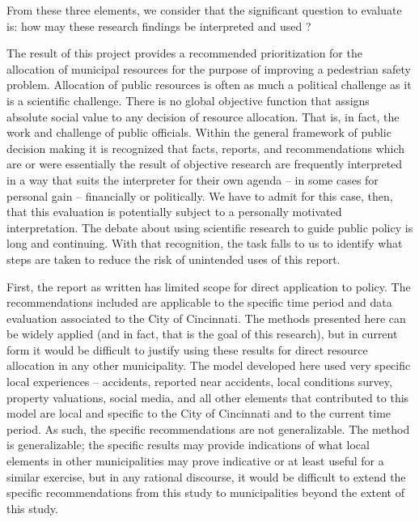 \documentclass{llncs}
\begin{document}
From these three elements, we consider that the significant question to evaluate is: how may these research findings be interpreted and used ?

The result of this project provides a recommended prioritization for the allocation of municipal resources for the purpose of improving a pedestrian safety problem. Allocation of  public resources is often as much a political challenge as it is a scientific challenge. There is no global objective function that assigns absolute social value to any decision of resource allocation. That is, in fact, the work and challenge of public officials. Within the general framework of public decision making it is recognized that facts, reports, and recommendations which are or were essentially the result of objective research are frequently interpreted in a way that suits the interpreter for their own agenda – in some cases for personal gain – financially or politically. We have to admit for this case, then, that this evaluation is potentially subject to a personally motivated interpretation. The debate about using scientific research to guide public policy is long and continuing. With that recognition, the task falls to us to identify what steps are taken to reduce the risk of unintended uses of this report.

First, the report as written has limited scope for direct application to policy. The recommendations included are applicable to the specific time period and data evaluation associated to the City of Cincinnati. The methods presented here can be widely applied (and in fact, that is the goal of this research), but in current form it would be difficult to justify using these results for direct resource allocation in any other municipality. The model developed here used very specific local experiences – accidents, reported near accidents, local conditions survey, property valuations, social media, and all other elements that contributed to this model are local and specific to the City of Cincinnati and to the current time period. As such, the specific recommendations are not generalizable. The method is generalizable; the specific results may provide indications of what local elements in other municipalities may prove indicative or at least useful for a similar exercise, but in any rational discourse, it would be difficult to extend the specific recommendations from this study to municipalities beyond the extent of this study.
\end{document}
